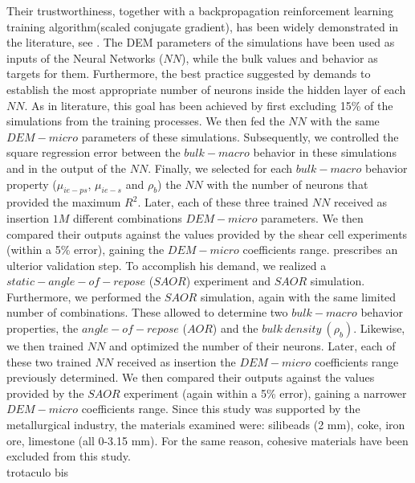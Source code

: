 Their trustworthiness, together with a backpropagation reinforcement learning training algorithm(scaled conjugate gradient), has been widely demonstrated in the literature, see \citet{RefWorks:158}.
The DEM parameters of the simulations have been used as inputs of the Neural Networks ($NN$), while the bulk values and behavior as targets for them.
Furthermore, the best practice suggested by \citet{RefWorks:150} demands to establish the most appropriate number of neurons inside the hidden layer of each $NN$.
As in literature, this goal has been achieved by first excluding 15\% of the simulations from the training processes.
We then fed the $NN$ with the same $DEM-micro$ parameters of these simulations.
Subsequently, we controlled the square regression error between the $bulk-macro$ behavior in these simulations and in the output of the $NN$.
Finally, we selected for each $bulk-macro$ behavior property ($\mu_{ie-ps}$, $\mu_{ie-s}$ and $\rho_b$) the $NN$ with the number of neurons that provided the maximum $R^2$.
Later, each of these three trained $NN$ received as insertion $1M$ different combinations $DEM-micro$ parameters.
We then compared their outputs against the values provided by the shear cell experiments (within a 5\% error), gaining the $DEM-micro$ coefficients range.
\citet{RefWorks:160} prescribes an ulterior validation step.
To accomplish his demand, we realized a $static-angle-of-repose$ ($SAOR$) experiment and $SAOR$ simulation.
Furthermore, we performed the $SAOR$ simulation, again with the same limited number of combinations.
These allowed to determine two $bulk-macro$ behavior properties, the $angle-of-repose$ ($AOR$) and the $bulk ~ density ~ (\rho_b)$.
Likewise, we then trained $NN$ and optimized the number of their neurons.
Later, each of these two trained $NN$ received as insertion the $DEM-micro$ coefficients range previously determined.
We then compared their outputs against the values provided by the $SAOR$ experiment (again within a 5\% error), gaining a narrower $DEM-micro$ coefficients range.
Since this study was supported by the metallurgical industry, the materials examined were: silibeads (2 mm), coke, iron ore, limestone (all 0-3.15 mm).
For the same reason, cohesive materials have been excluded from this study.\\ \label{par:materials}
trotaculo bis
